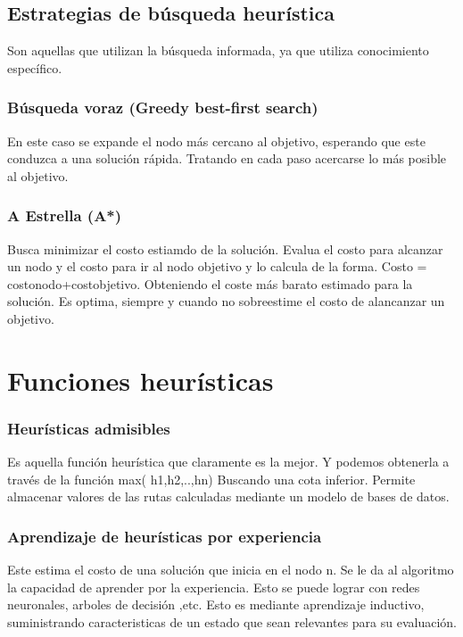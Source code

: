 \documentclass{article}
\begin{document}
\subsection{Estrategias de búsqueda heurística }

Son aquellas que utilizan la búsqueda informada, ya que utiliza conocimiento específico.

\subsubsection {Búsqueda voraz (Greedy best-first search)}
En este caso se expande el nodo más cercano al objetivo, esperando que este conduzca a una solución rápida. Tratando en cada paso acercarse lo más posible al objetivo. 


\subsubsection{A Estrella (A*)}

Busca minimizar el costo estiamdo de la solución. Evalua el costo para alcanzar un nodo y el costo para ir al nodo objetivo y lo calcula de la forma. Costo = costonodo+costobjetivo. Obteniendo el coste más barato estimado para la solución. Es optima, siempre y cuando no sobreestime el costo de alancanzar un objetivo.

\section{Funciones heurísticas }
\subsubsection{Heurísticas admisibles }
Es aquella función heurística que claramente es la mejor. Y podemos obtenerla a través de la función max( h1,h2,..,hn) Buscando una cota inferior. Permite almacenar valores de las rutas calculadas mediante un modelo de bases de datos.
\subsubsection{Aprendizaje de heurísticas por experiencia }
Este estima el costo  de una solución que inicia en el nodo n. Se le da al algoritmo la capacidad de aprender por la experiencia. Esto se puede lograr con redes neuronales, arboles de decisión ,etc. Esto es mediante aprendizaje inductivo, suministrando caracteristicas de un estado que sean relevantes para su evaluación. 
\end{document}

